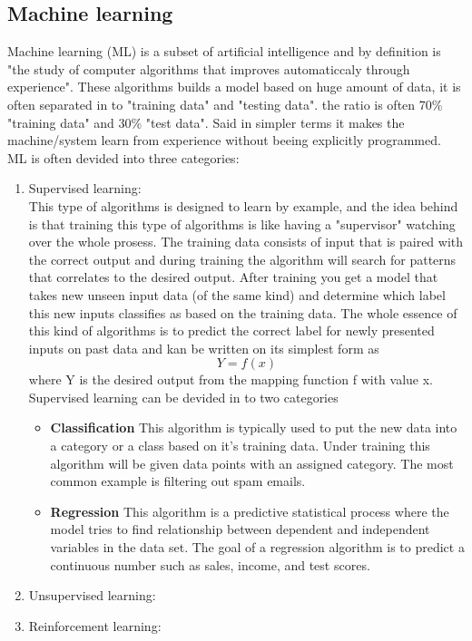\documentclass[conference]{IEEEtran}
\begin{document}
 \subsection{Machine learning}
	Machine learning (ML) is a subset of artificial intelligence and by definition is "the study of computer algorithms 
	that improves automaticcaly through experience". %
	These algorithms builds a model based on huge amount of data, it is often separated in to "training data" and "testing data".
	the ratio is often 70\% "training data" and 30\% "test data". Said in simpler terms it makes the machine/system learn from experience
	without beeing explicitly programmed.  
	ML is often devided into three categories:
	\begin{enumerate}
		\item Supervised learning:\\
		This type of algorithms is designed to learn by example, and the idea behind is that training this type of algorithms is like having 
		a "supervisor" watching over the whole prosess. The training data consists of input that is paired with the correct output and during 
		training the algorithm will search for patterns that correlates to the desired output. After training you get a model that takes new 
		unseen input data (of the same kind) and determine which label this new inputs classifies as based on the training data. The whole essence 
		of this kind of algorithms is to predict the correct label for newly presented inputs on past data and kan be written on its simplest form as 
		$$ Y = f(x)$$ where Y is the desired output from the mapping function f with value x. Supervised learning can be devided in to two categories
		\begin{itemize}
			\item \textbf{Classification}
			This algorithm is typically used to put the new data into a category or a class based on it's training data. Under training this algorithm 
			will be given data points with an assigned category. The most common example is filtering out spam emails.
			\item \textbf{Regression}
			This algorithm is a predictive statistical process where the model tries to find relationship between dependent and independent variables 
			in the data set. The goal of a regression algorithm is to predict a continuous number such as sales, income, and test scores.
		\end{itemize}
		\item Unsupervised learning:\\
		
		\item Reinforcement learning:\\
		
	\end{enumerate}
\end{document}
